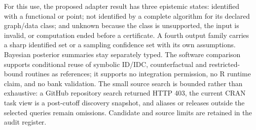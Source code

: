 For this use, the proposed adapter result has three epistemic states: identified with a functional or point; not identified by a complete algorithm for its declared graph/data class; and unknown because the class is unsupported, the input is invalid, or computation ended before a certificate. A fourth output family carries a sharp identified set or a sampling confidence set with its own assumptions. Bayesian posterior summaries stay separately typed. The software comparison supports conditional reuse of symbolic ID/IDC, counterfactual and restricted-bound routines as references; it supports no integration permission, no R runtime claim, and no bank validation. The small source search is bounded rather than exhaustive: a GitHub repository search returned HTTP 403, the current CRAN task view is a post-cutoff discovery snapshot, and aliases or releases outside the selected queries remain omissions. Candidate and source limits are retained in the audit register.
